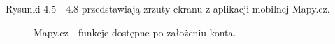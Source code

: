 Rysunki 4.5 - 4.8 przedstawiają zrzuty ekranu z aplikacji mobilnej Mapy.cz.
\begin{figure}[H]
    \centering
    \caption{Mapy.cz - funkcje dostępne po założeniu konta.}
    \label{mapycz:logowanie}
\end{figure}
